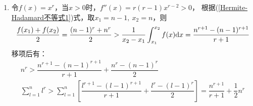\begin{enumerate}[label={\textbf{\arabic*.}},leftmargin=
    \inteval{\myenumleftmargin}pt]
即可得(\ref{凹凸性习题-伯努利不等式})式成立。\\
(5) $ p\e^{x_1}+q\e^{x_2}\geq \e^{px_1+qx_2} $，令$ \e^{x_1}=u_1>0 $，
$ \e^{x_2}=u_2>0 $，则只需证$ pu_1+qu_2\geq u_1^pu_2^q $，这就是(4)的结果。\\
(6) 
\begin{gather*}
    \dfrac{1}{4}(x_1^2+2+2\sqrt{x_1^2+2}\sqrt{x_2^2+2}+x_2^2+2)\geq 
    \dfrac{1}{4}(x_1^2+2x_1x_2+x_2^2)+2 \q \Leftrightarrow \\
    \sqrt{x_1^2+2}\sqrt{x_2^2+2}\geq x_1x_2+2 \q \text{(两边平方即可证明)}
\end{gather*}
(7) 要证$ \dfrac{1}{2}(x_1\ln x_1+x_2\ln x_2)\geq \dfrac{x_1+x_2}{2}
\ln \dfrac{x_1+x_2}{2} $，可以固定$ x_1 $，以$ x_2 $为变量，
然后对$ x_2 $求导，过程略。\\
(8)把(7)中的$ x_i $换成$ \e^{x_i} $即得。\\
请读者分别计算以上各个函数的二阶导数，并判断其正负号，再结合函数图像
体会二阶导数的正负与凹凸性的关系。

\item 
令$ f(x)=x^r $，当$ x>0 $时，$ f''(x)=r(r-1)x^{r-2}>0 $，
根据(\ref{Hermite-Hadamard不等式1})式，取$ x_1=n-1,\ x_2=n $，则
\begin{gather*}
    \dfrac{f(x_1)+f(x_2)}{2}=\dfrac{(n-1)^r+n^r}{2}>
    \dfrac{1}{x_2-x_1}\int_{x_1}^{x_2}f(x)\mathrm{d} x=\dfrac{n^{r+1}-(n-1)^{r+1}}{r+1}
\end{gather*}
移项后有：
\begin{gather*}
    n^r > \dfrac{n^{r+1}-(n-1)^{r+1}}{r+1}+\dfrac{n^{r}-(n-1)^{r}}{2} \\
    \sum\limits_{l=1}^n l^r>\sum_{l=1}^n
    \left[\dfrac{l^{r+1}-(l-1)^{r+1}}{r+1}+\dfrac{l^{r}-(l-1)^{r}}{2}\right]=
    \dfrac{n^{r+1}}{r+1}+\dfrac{1}{2}n^r
\end{gather*}


\end{enumerate}
